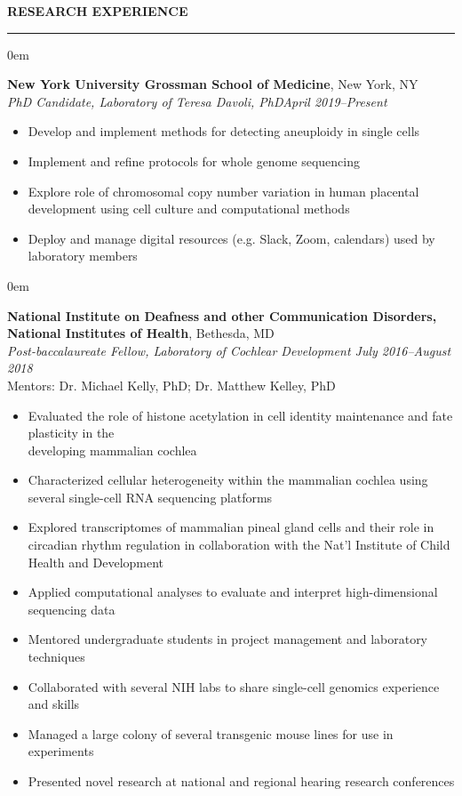 \documentclass[10pt, letterpaper]{article} %
\newenvironment{CVSection}{
\begin{addmargin}[2em]{0em}
\begin{samepage}}
{\end{samepage}
\end{addmargin}\bigskip}
\newcommand{\CVHeading}[1]{
\MakeUppercase{\bf #1}
\smallskip
\hrule
\medskip
}
\begin{document}
\CVHeading{Research Experience}
\begin{CVSection}
\textbf{New York University Grossman School of Medicine}, New York, NY\\
\textsl{PhD Candidate, Laboratory of Teresa Davoli, PhD\hfill April 2019--Present}
\begin{itemize}
    \item Develop and implement methods for detecting aneuploidy in single cells
    \item Implement and refine protocols for whole genome sequencing
    \item Explore role of chromosomal copy number variation in human placental development using cell culture and computational methods
    \item Deploy and manage digital resources (e.g. Slack, Zoom, calendars) used by laboratory members
\end{itemize}
\end{CVSection}
\begin{CVSection}
\textbf{National Institute on Deafness and other Communication Disorders,\\National Institutes of Health}, Bethesda, MD\\
\textsl{Post-baccalaureate Fellow, Laboratory of Cochlear Development	\hfill July 2016--August 2018\\}
Mentors: Dr. Michael Kelly, PhD; Dr. Matthew Kelley, PhD
\begin{itemize}
\item Evaluated the role of histone acetylation in cell identity maintenance and fate plasticity in the\\ developing mammalian cochlea
\item Characterized cellular heterogeneity within the mammalian cochlea using several single-cell RNA sequencing platforms
\item Explored transcriptomes of mammalian pineal gland cells and their role in circadian rhythm regulation in collaboration with the Nat'l Institute of Child Health and Development
\item Applied computational analyses to evaluate and interpret high-dimensional sequencing data
\item Mentored undergraduate students in project management and laboratory techniques
\item Collaborated with several NIH labs to share single-cell genomics experience and skills
\item Managed a large colony of several transgenic mouse lines for use in experiments
\item Presented novel research at national and regional hearing research conferences
\end{itemize}
\end{CVSection}
\end{document}
